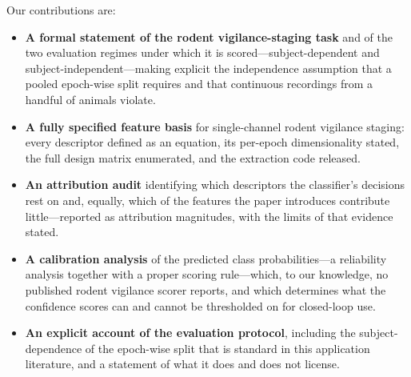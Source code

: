 \noindent Our contributions are:
\begin{itemize}\itemsep1pt\parskip0pt
\item \textbf{A formal statement of the rodent vigilance-staging task} and of the two evaluation regimes under which it is scored---subject-dependent and subject-independent---making explicit the independence assumption that a pooled epoch-wise split requires and that continuous recordings from a handful of animals violate.
\item \textbf{A fully specified feature basis} for single-channel rodent vigilance staging: every descriptor defined as an equation, its per-epoch dimensionality stated, the full design matrix enumerated, and the extraction code released.
\item \textbf{An attribution audit} identifying which descriptors the classifier's decisions rest on and, equally, which of the features the paper introduces contribute little---reported as attribution magnitudes, with the limits of that evidence stated.
\item \textbf{A calibration analysis} of the predicted class probabilities---a reliability analysis together with a proper scoring rule---which, to our knowledge, no published rodent vigilance scorer reports, and which determines what the confidence scores can and cannot be thresholded on for closed-loop use.
\item \textbf{An explicit account of the evaluation protocol}, including the subject-dependence of the epoch-wise split that is standard in this application literature, and a statement of what it does and does not license.
\end{itemize}

